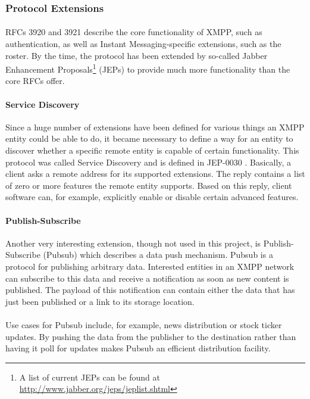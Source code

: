 \subsubsection{Protocol Extensions}
\paragraph{}
RFCs 3920 and 3921 describe the core functionality of XMPP, such as authentication, as well as Instant Messaging-specific extensions, such as the roster. By the time, the protocol has been extended by so-called Jabber Enhancement Proposals\footnote{A list of current JEPs can be found at \href{http://www.jabber.org/jeps/jeplist.shtml}{http://www.jabber.org/jeps/jeplist.shtml}} (JEPs) to provide much more functionality than the core RFCs offer.

\paragraph{Service Discovery}
\label{sec:disco}
Since a huge number of extensions have been defined for various things an XMPP entity could be able to do, it became necessary to define a way for an entity to discover whether a specific remote entity is capable of certain functionality. This protocol was called Service Discovery and is defined in JEP-0030 \cite{jep0030}. Basically, a client asks a remote address for its supported extensions. The reply contains a list of zero or more features the remote entity supports. Based on this reply, client software can, for example, explicitly enable or disable certain advanced features.

\paragraph{Publish-Subscribe}
Another very interesting extension, though not used in this project, is Publish-Subscribe (Pubsub) \cite{jep0060} which describes a data push mechanism. Pubsub is a protocol for publishing arbitrary data. Interested entities in an XMPP network can subscribe to this data and receive a notification as soon as new content is published. The payload of this notification can contain either the data that has just been published or a link to its storage location.

\paragraph{}
Use cases for Pubsub include, for example, news distribution or stock ticker updates. By pushing the data from the publisher to the destination rather than having it poll for updates makes Pubsub an efficient distribution facility.

